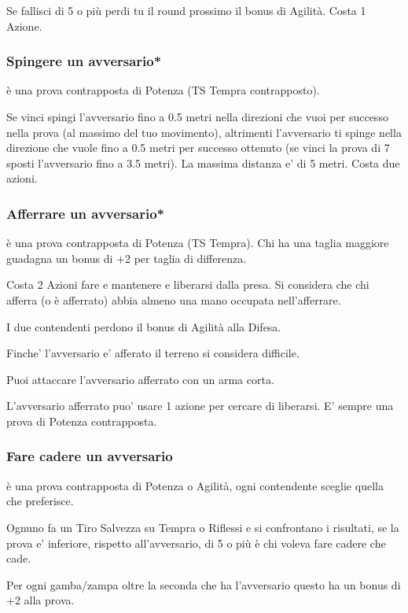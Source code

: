 \documentclass[a4paper,11pt,twoside,openany]{book}
\begin{document}
Se fallisci di 5 o più perdi tu il round prossimo il bonus di Agilità.
Costa 1 Azione.

\subsubsection{Spingere un avversario*} è una prova contrapposta di Potenza (TS Tempra contrapposto).

Se vinci spingi l'avversario fino a 0.5 metri nella direzioni che vuoi per successo nella prova (al massimo del tuo movimento), altrimenti l'avversario ti spinge nella direzione che vuole fino a 0.5 metri per successo ottenuto (se vinci la prova di 7 sposti l'avversario fino a 3.5 metri). La massima distanza e' di 5 metri.
Costa due azioni.

\subsubsection{Afferrare un avversario*} è una prova contrapposta di Potenza (TS Tempra). Chi ha una taglia maggiore guadagna un bonus di +2 per taglia di differenza.

Costa 2 Azioni fare e mantenere e liberarsi dalla presa. Si considera che chi afferra (o è afferrato) abbia almeno una mano occupata nell'afferrare.

I due contendenti perdono il bonus di Agilità alla Difesa.

Finche' l'avversario e' afferato il terreno si considera difficile.

Puoi attaccare l'avversario afferrato con un arma corta.

L'avversario afferrato puo' usare 1 azione per cercare di liberarsi. E' sempre una prova di Potenza contrapposta.

\subsubsection{Fare cadere un avversario} è una prova contrapposta di Potenza o Agilità, ogni contendente sceglie quella che preferisce.

Ognuno fa un Tiro Salvezza su Tempra o Riflessi e si confrontano i risultati, se la prova e' inferiore, rispetto all'avversario, di 5 o più è chi voleva fare cadere che cade.

Per ogni gamba/zampa oltre la seconda che ha l'avversario questo ha un bonus di +2 alla prova. 
\end{document}
